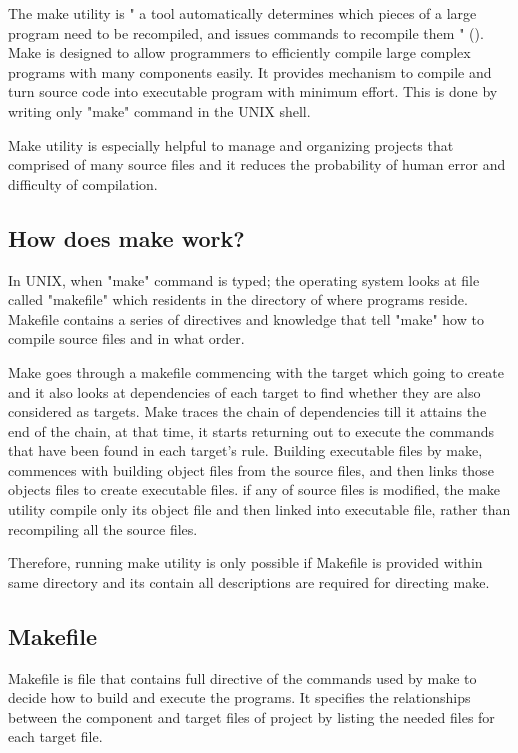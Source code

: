 \documentclass[11pt]{report}
\begin{document}
The make utility is " a tool automatically determines which pieces of a large program need to be recompiled, and issues commands to recompile them " (\cite{Stallman:2000:GnuMake}). Make is designed to allow programmers to efficiently compile large complex programs with many components easily. It provides mechanism to compile and turn source code into executable program with minimum effort. This is done by writing only "make" command in the UNIX shell.  

Make utility is especially helpful to manage and organizing projects that comprised of many source files and it reduces the probability of human error and difficulty of compilation.

\subsection{How does make work?}
\label{subsec: how make work}
In UNIX, when "make" command is typed; the operating system looks at file called "makefile" which residents in the directory of where programs reside. Makefile contains a series of directives and knowledge that tell "make" how to compile source files and in what order. 

Make goes through a makefile commencing with the target which going to create and it also looks at dependencies  of each target to find whether they are also considered as targets.  Make traces the chain of dependencies till it attains the end of the chain, at that time, it starts returning out to execute the commands that have been found in each target's rule. Building executable files by make, commences with building object files from the source files, and then links those objects files to create executable files. if any of source files is modified, the make utility compile only its object file and then linked into executable file, rather than recompiling all the source files. 

Therefore, running make utility is only possible if Makefile is provided within same directory and its contain all descriptions are required for directing make.

\subsection{Makefile}
\label{subsec: makefile}
Makefile is file that contains full directive of the commands used by make to decide how to build and execute the programs. It specifies the relationships between the component and target files of project by listing the needed files for each target file.
\end{document}
